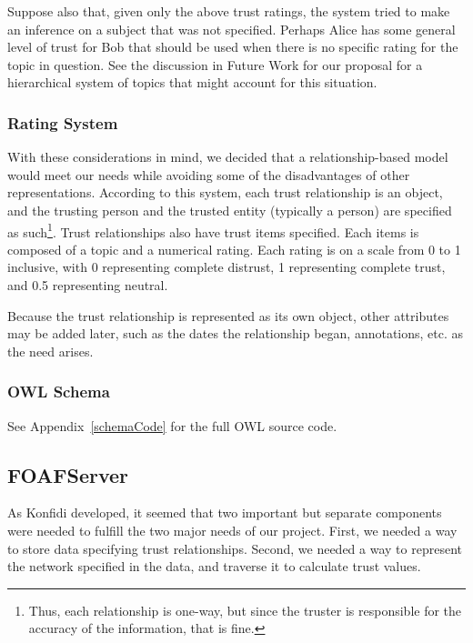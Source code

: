 \documentclass[onecolumn]{acm_proc_article-sp}
\begin{document}
Suppose also that, given only the above trust ratings, the system tried to make an inference on a subject that was not specified.  Perhaps Alice has some general level of trust for Bob that should be used when there is no specific rating for the topic in question.  See the discussion in Future Work for our proposal for a hierarchical system of topics that might account for this situation.

\subsubsection{Rating System}
With these considerations in mind, we decided that a relationship-based model would meet our needs while avoiding some of the disadvantages of other representations.  According to this system, each trust relationship is an object, and the trusting person and the trusted entity (typically a person) are specified as such\footnote{Thus, each relationship is one-way, but since the truster is responsible for the accuracy of the information, that is fine.}.  Trust relationships also have trust items specified.  Each items is composed of a topic and a numerical rating.  Each rating is on a scale from 0 to 1 inclusive, with 0 representing complete distrust, 1 representing complete trust, and 0.5 representing neutral.

Because the trust relationship is represented as its own object, other attributes may be added later, such as the dates the relationship began, annotations, etc. as the need arises.

\subsubsection{OWL Schema}
See Appendix~\ref{schemaCode} for the full OWL source code.

\subsection{FOAFServer}
As Konfidi developed, it seemed that two important but separate components were needed to fulfill the two major needs of our project.  First, we needed a way to store data specifying trust relationships.  Second, we needed a way to represent the network specified in the data, and traverse it to calculate trust values.
\end{document}
